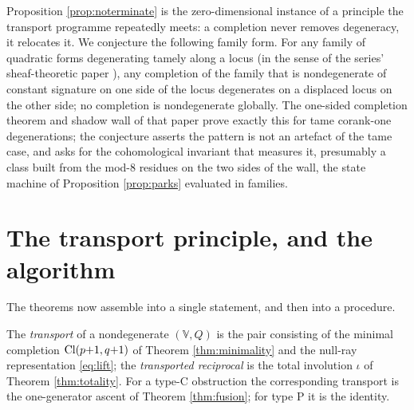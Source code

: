 \begin{conjecture}\label{conj:conservation}
Proposition \ref{prop:noterminate} is the zero-dimensional instance of a principle the transport programme repeatedly meets: a completion never removes degeneracy, it relocates it. We conjecture the following family form. For any family of quadratic forms degenerating tamely along a locus (in the sense of the series' sheaf-theoretic paper \cite{ButlerT4}), any completion of the family that is nondegenerate of constant signature on one side of the locus degenerates on a displaced locus on the other side; no completion is nondegenerate globally. The one-sided completion theorem and shadow wall of that paper prove exactly this for tame corank-one degenerations; the conjecture asserts the pattern is not an artefact of the tame case, and asks for the cohomological invariant that measures it, presumably a class built from the mod-8 residues on the two sides of the wall, the state machine of Proposition \ref{prop:parks} evaluated in families.
\end{conjecture}

\section{The transport principle, and the algorithm}\label{sec:principle}


The theorems now assemble into a single statement, and then into a procedure.

\begin{definition}[Transport]\label{def:transport}
The \emph{transport} of a nondegenerate $(\mathbb{V}, Q)$ is the pair consisting of the minimal completion $\mathrm{Cl}(p{+}1,q{+}1)$ of Theorem \ref{thm:minimality} and the null-ray representation \eqref{eq:lift}; the \emph{transported reciprocal} is the total involution $\iota$ of Theorem \ref{thm:totality}. For a type-C obstruction the corresponding transport is the one-generator ascent of Theorem \ref{thm:fusion}; for type P it is the identity.
\end{definition}


